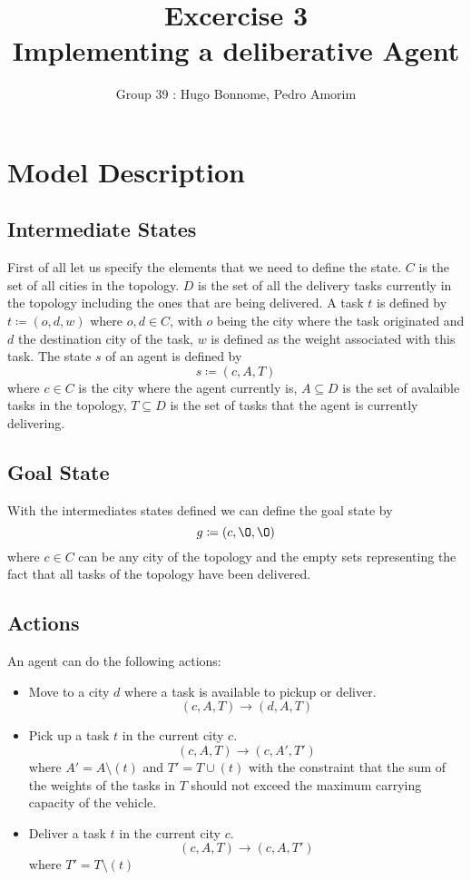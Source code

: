 \documentclass[11pt]{article}
\title{\bf Excercise 3\\ Implementing a deliberative Agent}
\author{Group 39 : Hugo Bonnome, Pedro Amorim}
\begin{document}
\maketitle

\section{Model Description}

\subsection{Intermediate States}
First of all let us specify the elements that we need to define the state.
$ C $ is the set of all cities in the topology. $ D $ is the set of all the
delivery tasks currently in the topology including the ones that are being
delivered.
A task $ t $ is defined by $ t \coloneqq (o, d, w) $ where $ o, d \in C $, with
$ o $ being the city where the task originated and $ d $ the destination city of
the task, $ w $ is defined as the weight associated with this task. The state $
s $ of an agent is defined by $$ s \coloneqq (c, A, T) $$ where $c \in C$ is the
city where the agent currently is, $ A \subseteq D $ is the set of avalaible
tasks in the topology, $ T \subseteq D $ is the set of tasks that the agent is
currently delivering.

\subsection{Goal State}
With the intermediates states defined we can define the goal state by $$ g
\coloneqq (c, \O, \O) $$ where $ c \in C $ can be any city of the topology and
the empty sets representing the fact that all tasks of the topology have been
delivered.

\subsection{Actions}
An agent can do the following actions:
\begin{itemize}
\item Move to a city $ d $ where a task is available to pickup or deliver. $$
(c, A, T) \rightarrow (d, A, T) $$
\item Pick up a task $ t $ in the current city $ c $. $$ (c, A, T) \rightarrow
  (c, A', T') $$ where $ A' = A \setminus (t) $ and $ T' = T \cup (t) $ with the
  constraint that the sum of the weights of the tasks in $ T $ should not exceed
  the maximum carrying capacity of the vehicle.
\item Deliver a task $ t $ in the current city $ c $. $$ (c, A, T) \rightarrow
  (c, A, T') $$ where $ T' = T \setminus (t) $
\end{itemize}
\end{document}
